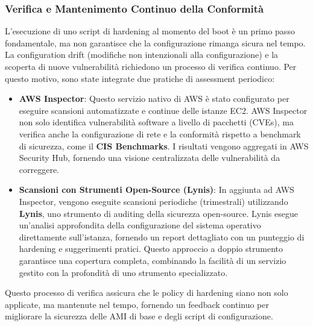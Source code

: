 \subsubsection{Verifica e Mantenimento Continuo della Conformità}
\label{subsubsec:hardening-verification_cap2}
L'esecuzione di uno script di hardening al momento del boot è un primo passo fondamentale, ma non garantisce che la configurazione rimanga sicura nel tempo. La configuration drift (modifiche non intenzionali alla configurazione) e la scoperta di nuove vulnerabilità richiedono un processo di verifica continuo. Per questo motivo, sono state integrate due pratiche di assessment periodico:
\begin{itemize}
\item \textbf{AWS Inspector}: Questo servizio nativo di AWS è stato configurato per eseguire scansioni automatizzate e continue delle istanze EC2. AWS Inspector non solo identifica vulnerabilità software a livello di pacchetti (CVEs), ma verifica anche la configurazione di rete e la conformità rispetto a benchmark di sicurezza, come il \textbf{CIS Benchmarks}. I risultati vengono aggregati in AWS Security Hub, fornendo una visione centralizzata delle vulnerabilità da correggere.
\item \textbf{Scansioni con Strumenti Open-Source (Lynis)}: In aggiunta ad AWS Inspector, vengono eseguite scansioni periodiche (trimestrali) utilizzando \textbf{Lynis}, uno strumento di auditing della sicurezza open-source. Lynis esegue un'analisi approfondita della configurazione del sistema operativo direttamente sull'istanza, fornendo un report dettagliato con un punteggio di hardening e suggerimenti pratici. Questo approccio a doppio strumento garantisce una copertura completa, combinando la facilità di un servizio gestito con la profondità di uno strumento specializzato.
\end{itemize}
Questo processo di verifica assicura che le policy di hardening siano non solo applicate, ma mantenute nel tempo, fornendo un feedback continuo per migliorare la sicurezza delle AMI di base e degli script di configurazione.

